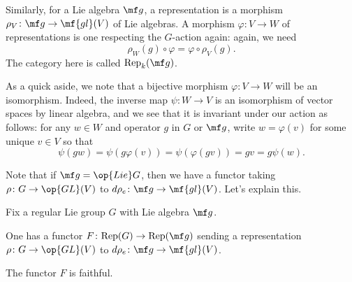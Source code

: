 \documentclass[../notes.tex]{subfiles}
\begin{document}
Similarly, for a Lie algebra $\mf g$, a representation is a morphism $\rho_V\colon\mf g\to\mf{gl}(V)$ of Lie algebras. A morphism $\varphi\colon V\to W$ of representations is one respecting the $G$-action again: again, we need
\[\rho_W(g)\circ\varphi=\varphi\circ\rho_V(g).\]
The category here is called $\mathrm{Rep}_k(\mf g)$.
\begin{remark} \label{rem:bijective-morphism-reps}
	As a quick aside, we note that a bijective morphism $\varphi\colon V\to W$ will be an isomorphism. Indeed, the inverse map $\psi\colon W\to V$ is an isomorphism of vector spaces by linear algebra, and we see that it is invariant under our action as follows: for any $w\in W$ and operator $g$ in $G$ or $\mf g$, write $w=\varphi(v)$ for some unique $v\in V$ so that
	\[\psi(gw)=\psi(g\varphi(v))=\psi(\varphi(gv))=gv=g\psi(w).\]
\end{remark}
Note that if $\mf g=\op{Lie}G$, then we have a functor taking $\rho\colon G\to\op{GL}(V)$ to $d\rho_e\colon\mf g\to\mf{gl}(V)$. Let's explain this.
\begin{lemma} \label{lem:rep-theory-to-lie-alg}
	Fix a regular Lie group $G$ with Lie algebra $\mf g$.
	\begin{listalph}
		\item One has a functor $F\colon\mathrm{Rep}(G)\to\mathrm{Rep}(\mf g)$ sending a representation $\rho\colon G\to\op{GL}(V)$ to $d\rho_e\colon\mf g\to\mf{gl}(V)$.
		\item The functor $F$ is faithful.
	\end{listalph}
\end{lemma}
\end{document}
